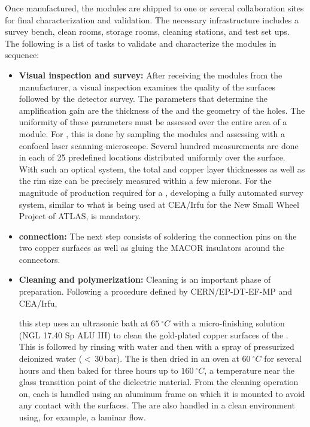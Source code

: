 Once manufactured, the  modules are shipped to one or several collaboration sites for final characterization and validation. The necessary infrastructure includes a survey bench, clean rooms, storage rooms, cleaning stations, and  test set ups. The following is a list of tasks to validate and characterize the modules in sequence:

\begin{itemize}
\item {\bf Visual inspection and survey:} After receiving the  modules from the manufacturer, a visual inspection examines the quality of the  surfaces 
followed by the detector survey. The parameters that determine the  amplification gain are the thickness of the  and the geometry of the holes. The uniformity of these parameters must be assessed over the entire area of a  module. For  , this is done by sampling the modules and assessing with a confocal laser scanning microscope. Several hundred measurements are done in each of \num{25} predefined locations distributed uniformly over the  surface. With such an optical system, the total  and copper layer thicknesses as well as the rim size can be precisely measured within a few microns.  For the magnitude of production required for a , developing a fully automated survey system, similar to what is being used at CEA/Irfu for the New Small Wheel Project of ATLAS, is mandatory. 

\item {\bf {} connection:} The next step consists of soldering the  connection pins on the two  copper surfaces as well as gluing the MACOR insulators around the connectors.

\item {\bf Cleaning and polymerization:} Cleaning is an important phase of  preparation. Following a procedure defined by CERN/EP-DT-EF-MP and CEA/Irfu,

 this step uses an ultrasonic bath at $\SI{65}{^\circ{}C}$ with a micro-finishing solution (NGL 17.40 Sp ALU III) to clean the gold-plated copper surfaces of the . This is followed by rinsing with water and then with a spray of pressurized deionized water 
 ($<$\,30\,bar). The  is then dried in an oven 
at $\SI{60}{^\circ{}C}$  for several hours and then baked for three hours up to $\SI{160}{^\circ{}C}$,  
a temperature near the glass transition point of the dielectric material. From the cleaning operation on, each  is handled using an aluminum frame on which it is mounted to avoid any contact with the  surfaces. The  are also 
handled in a clean environment using, for example, a laminar flow.  


\end{itemize}

